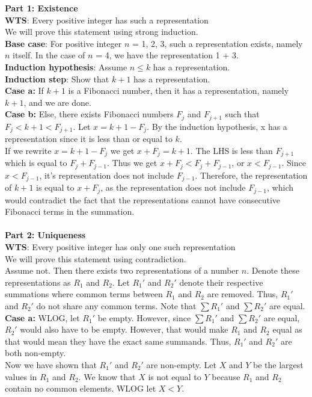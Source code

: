 \documentclass[12pt]{article}
\begin{document}
\textbf{Part 1: Existence}\\
\textbf{WTS}: Every positive integer has such a representation \\
We will prove this statement using strong induction.\\
\textbf{Base case}: For positive integer $n$ = 1, 2, 3, such a representation exists, namely $n$ itself. In the case of $n$ = 4, we have the representation 1 + 3. \\
\textbf{Induction hypothesis}: Assume $n \leq k$ has a representation. \\
\textbf{Induction step}: Show that $k+1$ has a representation. \\
\textbf{Case a:} If $k+1$ is a Fibonacci number, then it has a representation, namely $k+1$, and we are done. \\
\textbf{Case b:} Else, there exists Fibonacci numbers $F_{j}$ and $F_{j+1}$ such that $F_{j} < k+1 < F_{j+1}$. Let $x = k+1 - F_{j}$. By the induction hypothesis, x has a representation since it is less than or equal to $k$.\\
If we rewrite $x = k+1 - F_{j}$ we get $x + F_{j} = k+1$. The LHS is less than $F_{j+1}$ which is equal to $F_{j} + F_{j-1}$. Thus we get $x + F_{j} < F_{j} + F_{j-1}$, or $x < F_{j-1}$. Since $x < F_{j-1}$, it's representation does not include $F_{j-1}$. Therefore, the representation of $k+1$ is equal to $x + F_{j}$, as the representation does not include $F_{j-1}$, which would contradict the fact that the representations cannot have consecutive Fibonacci terms in the summation.
\\\\
\textbf{Part 2: Uniqueness}\\
\textbf{WTS}: Every positive integer has only one such representation \\
We will prove this statement using contradiction. \\
Assume not. Then there exists two representations of a number $n$. Denote these representations as $R_{1}$ and $R_{2}$. Let $R_{1}'$ and $R_{2}'$ denote their respective summations where common terms between $R_{1}$ and $R_{2}$ are removed. Thus, $R_{1}'$ and $R_{2}'$ do not share any common terms. Note that $\sum {R_{1}'}$ and $\sum {R_{2}'}$ are equal. \\
\textbf{Case a:} WLOG, let $R_{1}'$ be empty. However, since $\sum {R_{1}'}$ and $\sum {R_{2}'}$ are equal, $R_{2}'$ would also have to be empty. However, that would make $R_{1}$ and $R_{2}$ equal as that would mean they have the exact same summands. Thus, $R_{1}'$ and $R_{2}'$ are both non-empty.\\
Now we have shown that $R_{1}'$ and $R_{2}'$ are non-empty. Let $X$ and $Y$ be the largest values in $R_{1}$ and $R_{2}$. We know that $X$ is not equal to $Y$ because $R_{1}$ and $R_{2}$ contain no common elements. WLOG let $X < Y$.
\\\\
\end{document}
